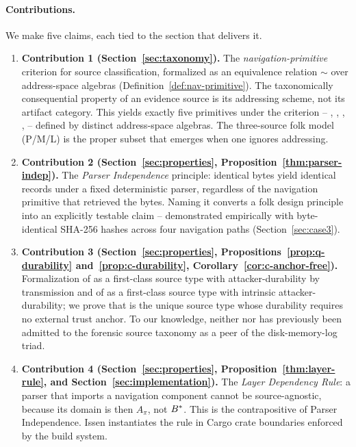 \paragraph{Contributions.}
We make five claims, each tied to the section that delivers it.
\begin{enumerate}
    \item \textbf{Contribution 1 (Section~\ref{sec:taxonomy}).} The
    \emph{navigation-primitive} criterion for source classification, formalized
    as an equivalence relation $\sim$ over address-space algebras
    (Definition~\ref{def:nav-primitive}). The taxonomically consequential
    property of an evidence source is its addressing scheme, not its artifact
    category. This yields exactly five primitives under the criterion --
    , , , ,  -- defined by distinct
    address-space algebras. The three-source folk model (P/M/L) is the proper
    subset that emerges when one ignores addressing.

    \item \textbf{Contribution 2 (Section~\ref{sec:properties}, Proposition~\ref{thm:parser-indep}).}
    The \emph{Parser Independence} principle: identical bytes yield identical
    records under a fixed deterministic parser, regardless of the navigation
    primitive that retrieved the bytes. Naming it converts a folk design
    principle into an explicitly testable claim -- demonstrated empirically
    with byte-identical SHA-256 hashes across four navigation paths
    (Section~\ref{sec:case3}).

    \item \textbf{Contribution 3 (Section~\ref{sec:properties}, Propositions~\ref{prop:q-durability} and~\ref{prop:c-durability}, Corollary~\ref{cor:c-anchor-free}).}
    Formalization of  as a first-class source type with attacker-durability
    by transmission and of  as a first-class source type with intrinsic
    attacker-durability; we prove that  is the unique source type whose
    durability requires no external trust anchor. To our knowledge, neither
     nor  has previously been admitted to the forensic source
    taxonomy as a peer of the disk-memory-log triad.

    \item \textbf{Contribution 4 (Section~\ref{sec:properties}, Proposition~\ref{thm:layer-rule}, and Section~\ref{sec:implementation}).}
    The \emph{Layer Dependency Rule}: a parser that imports a navigation
    component cannot be source-agnostic, because its domain is then
    $A_\pi$, not $B^{*}$. This is the contrapositive of Parser Independence.
    Issen instantiates the rule in Cargo crate boundaries enforced by the
    build system.


\end{enumerate}
